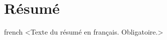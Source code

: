 \chapter*{Résumé}               %
\label{chap-resume}             %

\begin{otherlanguage*}{french}
  <Texte du résumé en français. Obligatoire.>
\end{otherlanguage*}
